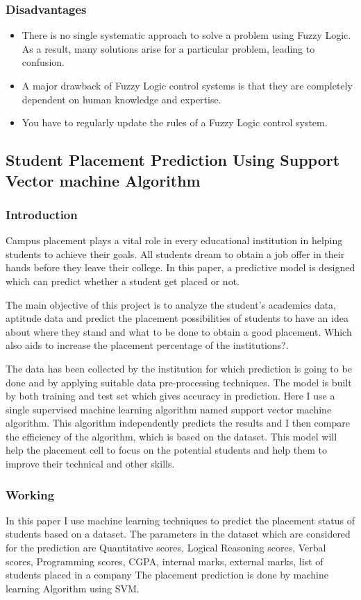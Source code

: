 \documentclass[12pt]{article}
\begin{document}
\subsubsection{Disadvantages}
\begin{itemize}
\item There is no single systematic approach to solve a problem using Fuzzy Logic. As a result, many solutions arise for a particular problem, leading to confusion.
\item A major drawback of Fuzzy Logic control systems is that they are completely dependent on human knowledge and expertise.
\item You have to regularly update the rules of a Fuzzy Logic control system.
\end{itemize}


\newpage
\subsection{Student Placement Prediction Using Support Vector machine Algorithm}
\subsubsection{Introduction}
Campus placement plays a vital role in every educational institution in helping students to achieve their goals.
All students dream to obtain a job offer in their hands before they leave their college. In this paper, a predictive model is 
designed which can predict whether a student get placed or not. 

The main objective of this project is to analyze the student’s academics data, aptitude data and predict the placement possibilities of students to have an idea about where they stand and what to be done to obtain a good placement. Which also aids to increase the placement percentage of the institutions?.

The data has been collected by the institution for which prediction is going to be done and by applying 
suitable data pre-processing techniques. The model is built by both training and test set which gives accuracy in 
prediction. Here I use a single supervised machine learning algorithm named support vector machine algorithm. This 
algorithm independently predicts the results and I then compare the efficiency of the algorithm, which is based on the 
dataset. This model will help the placement cell to focus on the potential students and help them to improve their technical 
and other skills.
\newpage
\subsubsection{Working}
In this paper I use machine learning techniques to predict the placement status of students based on a dataset. The 
parameters in the dataset which are considered for the prediction are Quantitative scores, Logical Reasoning scores, 
Verbal scores, Programming scores, CGPA, internal marks, external marks, list of students placed in a company The 
placement prediction is done by machine learning Algorithm using SVM.
\end{document}
